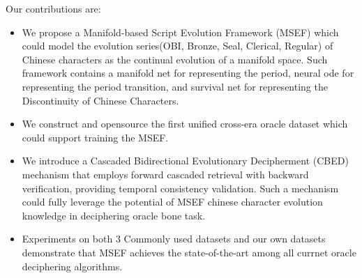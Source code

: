 \documentclass{article}
\begin{document}
Our contributions are:
\begin{itemize}[leftmargin=*,itemsep=2pt,topsep=2pt]
\item We propose a Manifold-based Script Evolution Framework (MSEF) which could model the evolution series(OBI, Bronze, Seal, Clerical, Regular) of Chinese characters as the continual evolution of a manifold space. Such framework contains a manifold net for representing the period, neural ode for representing the period transition, and survival net for representing the Discontinuity of Chinese Characters.
\item We construct and opensource the first unified cross-era oracle dataset which could support training the MSEF.
\item We introduce a Cascaded Bidirectional Evolutionary Decipherment (CBED) mechanism that employs forward cascaded retrieval with backward verification, providing temporal consistency validation. Such a mechanism could fully leverage the potential of MSEF chinese character evolution knowledge in deciphering oracle bone task.
\item  Experiments on both 3 Commonly used datasets and our own datasets demonstrate that MSEF achieves the state-of-the-art among all currnet oracle deciphering algorithms.
\end{itemize}
\end{document}
